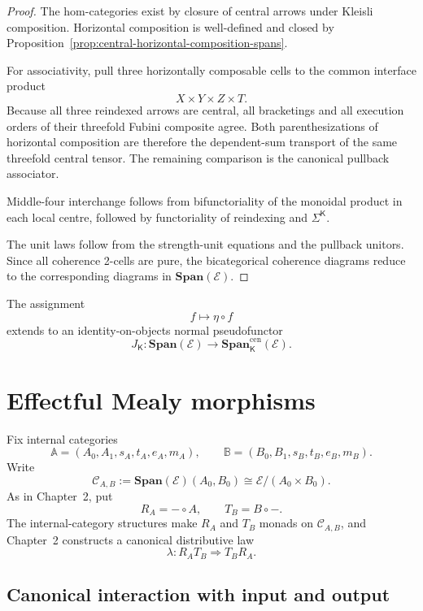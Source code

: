 \begin{proof}
The hom-categories exist by closure of central arrows under Kleisli
composition.  Horizontal composition is well-defined and closed by
Proposition~\ref{prop:central-horizontal-composition-spans}.

For associativity, pull three horizontally composable cells to the common
interface product
\[
    X\times Y\times Z\times T.
\]
Because all three reindexed arrows are central, all bracketings and all
execution orders of their threefold Fubini composite agree.  Both
parenthesizations of horizontal composition are therefore the dependent-sum
transport of the same threefold central tensor.  The remaining comparison is
the canonical pullback associator.

Middle-four interchange follows from bifunctoriality of the monoidal product
in each local centre, followed by functoriality of reindexing and
\(\Sigma^{\mathsf K}\).

The unit laws follow from the strength-unit equations and the pullback
unitors.  Since all coherence 2-cells are pure, the bicategorical coherence
diagrams reduce to the corresponding diagrams in
\(\mathbf{Span}(\mathcal E)\).
\end{proof}

\begin{corollary}
\label{cor:pure-span-embedding}
The assignment
\[
    f\longmapsto\eta\circ f
\]
extends to an identity-on-objects normal pseudofunctor
\[
    J_{\mathsf K}:
    \mathbf{Span}(\mathcal E)
    \longrightarrow
    \mathbf{Span}^{\mathrm{cen}}_{\mathsf K}(\mathcal E).
\]
\end{corollary}

\section{Effectful Mealy morphisms}
\label{sec:effectful-mealy-morphisms}

Fix internal categories
\[
    \mathbb A=(A_0,A_1,s_A,t_A,e_A,m_A),
    \qquad
    \mathbb B=(B_0,B_1,s_B,t_B,e_B,m_B).
\]
Write
\[
    \mathcal C_{A,B}
    :=
    \mathbf{Span}(\mathcal E)(A_0,B_0)
    \cong
    \mathcal E/(A_0\times B_0).
\]
As in Chapter~2, put
\[
    R_A=-\circ A,
    \qquad
    T_B=B\circ-.
\]
The internal-category structures make \(R_A\) and \(T_B\) monads on
\(\mathcal C_{A,B}\), and Chapter~2 constructs a canonical distributive law
\[
    \lambda:
    R_AT_B
    \Longrightarrow
    T_BR_A.
\]

\subsection{Canonical interaction with input and output}
\label{subsec:canonical-effect-input-output}


